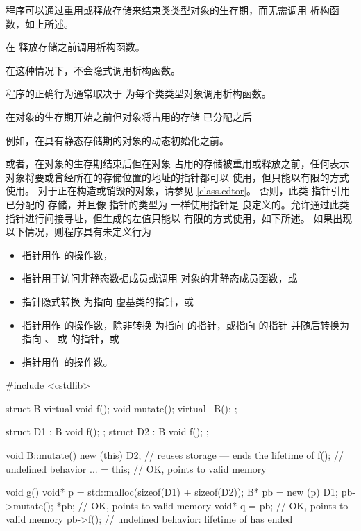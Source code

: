 \pnum
程序可以通过重用或释放存储来结束类类型对象的生存期，而无需调用
析构函数，如上所述。
\begin{note}
 在
释放存储之前调用析构函数。
\end{note}
在这种情况下，不会隐式调用析构函数。
\begin{note}
程序的正确行为通常取决于
为每个类类型对象调用析构函数。
\end{note}

\pnum
在对象的生存期开始之前但对象将占用的存储
已分配之后
\begin{footnote}
例如，在具有静态存储期的对象的动态初始化之前。

\end{footnote}
或者，在对象的生存期结束后但在对象
占用的存储被重用或释放之前，任何表示
对象将要或曾经所在的存储位置的地址的指针都可以
使用，但只能以有限的方式使用。
对于正在构造或销毁的对象，请参见 \ref{class.cdtor}。
否则，此类
指针引用已分配的
存储，并且像
指针的类型为  一样使用指针是
良定义的。允许通过此类指针进行间接寻址，但生成的左值只能以
有限的方式使用，如下所述。
如果出现以下情况，则程序具有未定义行为
\begin{itemize}
\item
  指针用作  的操作数，
\item
  指针用于访问非静态数据成员或调用
  对象的非静态成员函数，或
\item
  指针隐式转换 为指向
  虚基类的指针，或
\item
  指针用作
   的操作数，除非转换
  为指向 \cv{}  的指针，或指向 \cv{}  的指针
  并随后转换为指向
  \cv{} 、
  \cv{}  或
  \cv{}  的指针，或
\item
  指针用作
   的操作数。
\end{itemize}
\begin{example}
\begin{codeblock}
#include <cstdlib>

struct B {
  virtual void f();
  void mutate();
  virtual ~B();
};

struct D1 : B { void f(); };
struct D2 : B { void f(); };

void B::mutate() {
  new (this) D2;    // reuses storage --- ends the lifetime of 
  f();              // undefined behavior
  ... = this;       // OK,  points to valid memory
}

void g() {
  void* p = std::malloc(sizeof(D1) + sizeof(D2));
  B* pb = new (p) D1;
  pb->mutate();
  *pb;              // OK,  points to valid memory
  void* q = pb;     // OK,  points to valid memory
  pb->f();          // undefined behavior: lifetime of  has ended
}
\end{codeblock}
\end{example}

